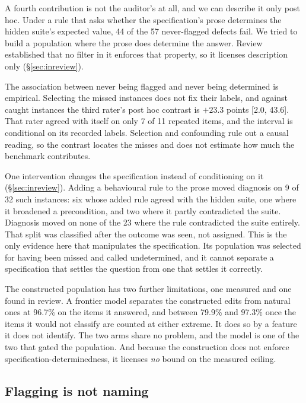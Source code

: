 A fourth contribution is not the auditor's at all, and we can describe it only post hoc. Under a
rule that asks whether the specification's prose determines the hidden suite's expected value, 44
of the 57 never-flagged defects fail. We tried to build a population where the prose does
determine the answer. Review established that no filter in it enforces that property, so it
licenses description only (\S\ref{sec:inreview}).

The association between never being flagged and never being determined is empirical. Selecting
the missed instances does not fix their labels, and against caught instances the third rater's
post hoc contrast is $+23.3$ points [2.0, 43.6]. That rater agreed with itself on only 7 of
11 repeated items, and the interval is conditional on its recorded labels. Selection and
confounding rule out a causal reading, so the contrast locates the misses and does not estimate
how much the benchmark contributes.

One intervention changes the specification instead of conditioning on it
(\S\ref{sec:inreview}). Adding a behavioural rule to the prose moved diagnosis on 9 of 32 such
instances: six whose added rule agreed with the hidden suite, one where it broadened a
precondition, and two where it partly contradicted the suite. Diagnosis moved on none of the 23
where the rule contradicted the suite entirely. That split was classified after the outcome was
seen, not assigned. This is the only evidence here that manipulates the specification. Its
population was selected for having been missed and called undetermined, and it cannot separate a
specification that settles the question from one that settles it correctly.

The constructed population has two further limitations, one measured and one found in review. A
frontier model separates the constructed edits from natural ones at 96.7\% on the items it answered, and
between 79.9\% and 97.3\% once the items it would not classify are counted at either extreme. It
does so by a feature it does not identify. The two arms share no problem, and the model is one of
the two that gated the population. And because the construction does not enforce
specification-determinedness, it licenses \emph{no} bound on the measured ceiling.

\subsection{Flagging is not naming}


